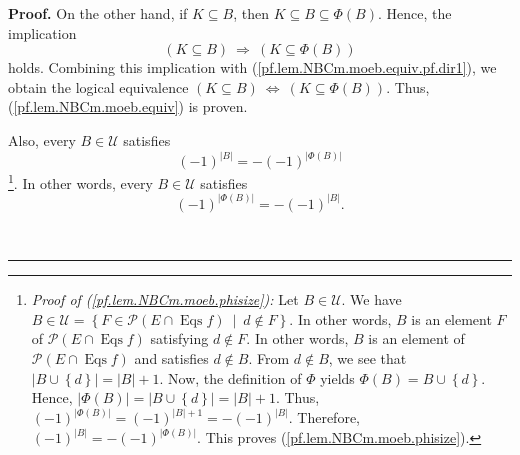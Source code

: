 \documentclass[numbers=enddot,12pt,final,onecolumn,notitlepage]{scrartcl}%
\theoremstyle{definition}
\newenvironment{proof}[1][Proof]{\noindent\textbf{#1.} }{\ \rule{0.5em}{0.5em}}
\newenvironment{verlong}{}{}
\begin{document}
\begin{verlong}
\begin{proof}
On the other hand, if $K\subseteq B$, then $K\subseteq B\subseteq\Phi\left(
B\right)  $. Hence, the implication%
\[
\left(  K\subseteq B\right)  \ \Longrightarrow\ \left(  K\subseteq\Phi\left(
B\right)  \right)
\]
holds. Combining this implication with (\ref{pf.lem.NBCm.moeb.equiv.pf.dir1}),
we obtain the logical equivalence $\left(  K\subseteq B\right)
\ \Longleftrightarrow\ \left(  K\subseteq\Phi\left(  B\right)  \right)  $.
Thus, (\ref{pf.lem.NBCm.moeb.equiv}) is proven.

Also, every $B\in\mathcal{U}$ satisfies%
\begin{equation}
\left(  -1\right)  ^{\left\vert B\right\vert }=-\left(  -1\right)
^{\left\vert \Phi\left(  B\right)  \right\vert }
\label{pf.lem.NBCm.moeb.phisize}%
\end{equation}
\footnote{\textit{Proof of (\ref{pf.lem.NBCm.moeb.phisize}):} Let
$B\in\mathcal{U}$. We have $B\in\mathcal{U}=\left\{  F\in\mathcal{P}\left(
E\cap\operatorname*{Eqs}f\right)  \ \mid\ d\notin F\right\}  $. In other
words, $B$ is an element $F$ of $\mathcal{P}\left(  E\cap\operatorname*{Eqs}%
f\right)  $ satisfying $d\notin F$. In other words, $B$ is an element of
$\mathcal{P}\left(  E\cap\operatorname*{Eqs}f\right)  $ and satisfies $d\notin
B$. From $d\notin B$, we see that $\left\vert B\cup\left\{  d\right\}
\right\vert =\left\vert B\right\vert +1$. Now, the definition of $\Phi$ yields
$\Phi\left(  B\right)  =B\cup\left\{  d\right\}  $. Hence, $\left\vert
\Phi\left(  B\right)  \right\vert =\left\vert B\cup\left\{  d\right\}
\right\vert =\left\vert B\right\vert +1$. Thus, $\left(  -1\right)
^{\left\vert \Phi\left(  B\right)  \right\vert }=\left(  -1\right)
^{\left\vert B\right\vert +1}=-\left(  -1\right)  ^{\left\vert B\right\vert }%
$. Therefore, $\left(  -1\right)  ^{\left\vert B\right\vert }=-\left(
-1\right)  ^{\left\vert \Phi\left(  B\right)  \right\vert }$. This proves
(\ref{pf.lem.NBCm.moeb.phisize}).}. In other words, every $B\in\mathcal{U}$
satisfies%
\begin{equation}
\left(  -1\right)  ^{\left\vert \Phi\left(  B\right)  \right\vert }=-\left(
-1\right)  ^{\left\vert B\right\vert }. \label{pf.lem.NBCm.moeb.phisize-1}%
\end{equation}



\end{proof}
\end{verlong}
\end{document}
